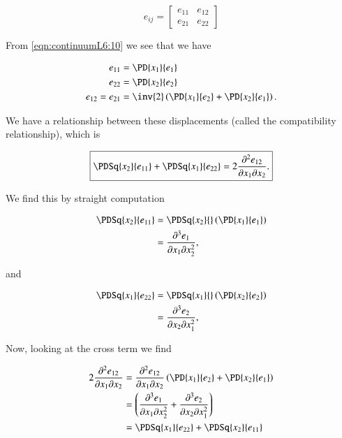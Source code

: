 \begin{equation}\label{eqn:continuumL6:50}
e_{ij} = 
\begin{bmatrix}
e_{11} & e_{12} \\
e_{21} & e_{22}
\end{bmatrix}
\end{equation}

From \ref{eqn:continuumL6:10} we see that we have

\begin{align}\label{eqn:continuumL6:70}
e_{11} &= \PD{x_1}{e_1} \\
e_{22} &= \PD{x_2}{e_2} \\
e_{12} = e_{21} &= 
\inv{2} \left( 
\PD{x_1}{e_2}
+ \PD{x_2}{e_1} 
\right).
\end{align}

We have a relationship between these displacements (called the compatibility relationship), which is

\begin{equation}\label{eqn:continuumL6:110}
\boxed{
\PDSq{x_2}{e_{11}} +
\PDSq{x_1}{e_{22}} = 
2
\frac{\partial^2 e_{12}}{\partial x_1 \partial x_2}.
}
\end{equation}

We find this by straight computation

\begin{align*}
\PDSq{x_2}{e_{11}} 
&= 
\PDSq{x_2}{}\left( 
\PD{x_1}{e_1}
\right) \\
&=
\frac{\partial^3 e_1}{\partial x_1 \partial x_2^2},
\end{align*}

and

\begin{align*}
\PDSq{x_1}{e_{22}} 
&= 
\PDSq{x_1}{}\left( 
\PD{x_2}{e_2}
\right) \\
&= 
\frac{\partial^3 e_2}{\partial x_2 \partial x_1^2},
\end{align*}

Now, looking at the cross term we find

\begin{align*}
2 \frac{\partial^2 e_{12}}{\partial x_1 \partial x_2} 
&= 
\frac{\partial^2 e_{12}}{\partial x_1 \partial x_2} 
\left(
\PD{x_1}{e_2}
+ \PD{x_2}{e_1} 
\right) \\
&=
\left(
\frac{\partial^3 e_1}{\partial x_1 \partial x_2^2} 
+
\frac{\partial^3 e_2}{\partial x_2 \partial x_1^2} 
\right) \\
&=
\PDSq{x_1}{e_{22}} 
+\PDSq{x_2}{e_{11}} 
\end{align*}


